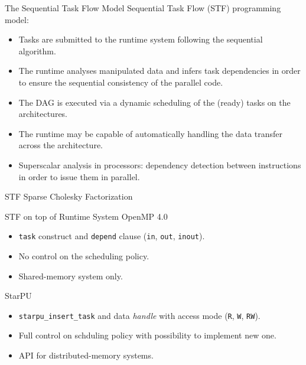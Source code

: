\documentclass[unknownkeysallowed]{beamer}
\newcommand{\db}[1]{\textcolor{mblue}{#1\xspace}}
\begin{document}
\begin{frame}{The Sequential Task Flow Model}  
  \alert{Sequential Task Flow} (STF) programming model:

  \begin{itemize}
  \item Tasks are submitted to the runtime system following the
    \db{sequential algorithm}.
  \item The runtime analyses manipulated data and infers task
    dependencies in order to ensure the \db{sequential consistency} of
    the parallel code.
  \item The DAG is executed via a \db{dynamic scheduling} of the
    (ready) tasks on the architectures.
  \item The runtime may be capable of automatically handling the data
    transfer across the architecture.
  \item \db{Superscalar analysis} in processors: dependency detection
    between instructions in order to issue them in parallel.
  \end{itemize} 
\end{frame}

\begin{frame}[fragile,t]{STF Sparse Cholesky Factorization}
  \only<1>{}
\end{frame}

\begin{frame}{STF on top of Runtime System}
  \alert{OpenMP 4.0}
  \begin{itemize}
  \item \texttt{task} construct and \texttt{depend} clause (\texttt{in}, \texttt{out},
    \texttt{inout}).
  \item No control on the scheduling policy.
  \item Shared-memory system only.
  \end{itemize}

  \vspace{0.5cm}

  \alert{StarPU}
  \begin{itemize}
  \item \texttt{starpu\_insert\_task} and data \textit{handle} with
    access mode (\texttt{R}, \texttt{W}, \texttt{RW}).
  \item Full control on schduling policy with possibility to implement
    new one.
  \item API for distributed-memory systems.
  \end{itemize}  
\end{frame}
\end{document}
